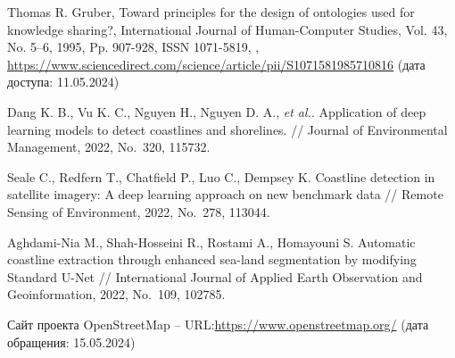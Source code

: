 \documentclass[732,14pt,final]{studrep}
\begin{document}
\begin{thebibliography}{99}
   Thomas R. Gruber,
Toward principles for the design of ontologies used for knowledge sharing?,
International Journal of Human-Computer Studies,
Vol. 43, No. 5–6,
1995,
Pp. 907-928,
ISSN 1071-5819,
, \url{https://www.sciencedirect.com/science/article/pii/S1071581985710816} (дата доступа: 11.05.2024)

 Dang K. B., Vu K. C., Nguyen H., Nguyen D. A., \emph{et al.}. Application of deep learning models to detect coastlines and shorelines. // Journal of Environmental Management, 2022, No.~320, 115732.

 Seale C., Redfern T., Chatfield P., Luo C., Dempsey K. Coastline detection in satellite imagery: A deep learning approach on new benchmark data // Remote Sensing of Environment, 2022, No.~278, 113044.

 Aghdami-Nia M., Shah-Hosseini R., Rostami A., Homayouni S. Automatic coastline extraction through enhanced sea-land segmentation by modifying Standard U-Net // International Journal of Applied Earth Observation and Geoinformation, 2022, No.~109, 102785.

 Сайт проекта OpenStreetMap -- URL:\url{https://www.openstreetmap.org/} (дата обращения: 15.05.2024)


\end{thebibliography}
\end{document}
